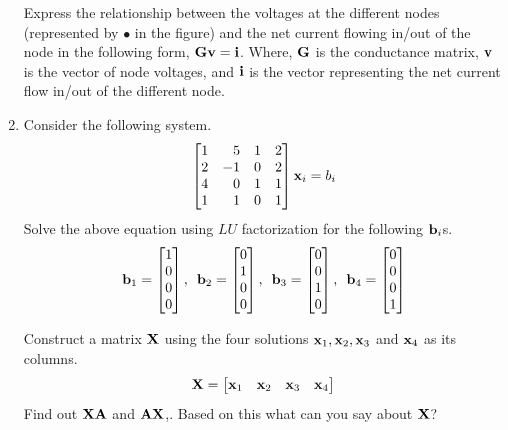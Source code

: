 \begin{enumerate}[resume]
     Express the relationship between the voltages at the different nodes (represented by $\bullet$ in the figure) and the net current flowing in/out of the node in the following form, $\mathbf{G}\mathbf{v} = \mathbf{i}$. Where, $\mathbf{G}$ is the conductance matrix, $\mathbf{v}$ is the vector of node voltages, and $\mathbf{i}$ is the vector representing the net current flow in/out of the different node.

    \item Consider the following system.
    \[\begin{bmatrix*}[r]
    1 & 5 & 1 & 2\\
    2 & -1 & 0 & 2\\
    4 & 0 & 1 & 1\\
    1 & 1 & 0 & 1\\
    \end{bmatrix*}\mf{x}_i = b_i \]
    Solve the above equation using $LU$ factorization for the following $\mathbf{b}_i$s.
    \[ \mf{b}_1 = \begin{bmatrix*}[r]
    1\\ 0\\ 0\\ 0\\
    \end{bmatrix*}, \,\,\,
    \mf{b}_2 = \begin{bmatrix*}[r]
    0\\ 1\\ 0\\ 0\\
    \end{bmatrix*}, \,\,\,
    \mf{b}_3 = \begin{bmatrix*}[r]
    0\\ 0\\ 1\\ 0\\
    \end{bmatrix*}, \,\,\,
    \mf{b}_4 = \begin{bmatrix*}[r]
    0\\ 0\\ 0\\ 1\\
    \end{bmatrix*}\]

    Construct a matrix $\mathbf{X}$ using the four solutions $\mathbf{x}_1, \mathbf{x}_2, \mathbf{x}_3$ and $\mathbf{x}_4$ as its columns.
    \[ \mf{X} = \begin{bmatrix*}\mf{x}_1 & \mf{x}_2 & \mf{x}_3 & \mf{x}_4\end{bmatrix*} \]
    Find out $\mathbf{XA}$ and $\mathbf{AX}$,. Based on this what can you say about $\mathbf{X}$?


\end{enumerate}
